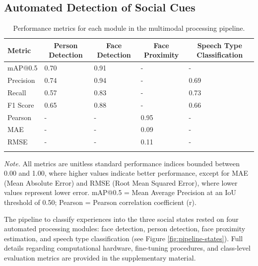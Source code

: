 \documentclass[
  english,
  12pt,
  man,floatsintext]{apa6}
\begin{document}
\subsection{Automated Detection of Social Cues}\label{automation}

\begin{table}[tbp]

\begin{center}
\begin{threeparttable}

\caption{\label{tab:module-metrics}Performance metrics for each module in the multimodal processing pipeline.}

\begin{tabular}{lllll}
\toprule
Metric & \multicolumn{1}{c}{Person Detection} & \multicolumn{1}{c}{Face Detection} & \multicolumn{1}{c}{Face Proximity} & \multicolumn{1}{c}{Speech Type Classification}\\
\midrule
mAP@0.5 & 0.70 & 0.91 & - & -\\
Precision & 0.74 & 0.94 & - & 0.69\\
Recall & 0.57 & 0.83 & - & 0.73\\
F1 Score & 0.65 & 0.88 & - & 0.66\\
Pearson & - & - & 0.95 & -\\
MAE & - & - & 0.09 & -\\
RMSE & - & - & 0.11 & -\\
\bottomrule
\addlinespace
\end{tabular}

\begin{tablenotes}[para]
\normalsize{\textit{Note.} All metrics are unitless standard performance indices bounded between 0.00 and 1.00, where higher values indicate better performance, except for MAE (Mean Absolute Error) and RMSE (Root Mean Squared Error), where lower values represent lower error. mAP@0.5 = Mean Average Precision at an IoU threshold of 0.50; Pearson = Pearson correlation coefficient (r).}
\end{tablenotes}

\end{threeparttable}
\end{center}

\end{table}

The pipeline to classify experiences into the three social states rested on four automated processing modules: face detection, person detection, face proximity estimation, and speech type classification (see Figure \ref{fig:pipeline-states}). Full details regarding computational hardware, fine-tuning procedures, and class-level evaluation metrics are provided in the supplementary material.
\end{document}
